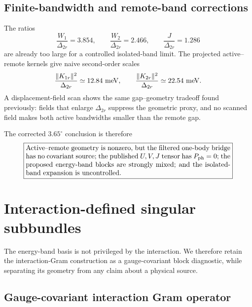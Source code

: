 \documentclass[11pt]{article}
\theoremstyle{remark}
\begin{document}
\subsection{Finite-bandwidth and remote-band corrections}

The ratios
\begin{equation}
 \frac{W_1}{\Delta_{2r}}=3.854,
 \qquad
 \frac{W_2}{\Delta_{2r}}=2.466,
 \qquad
 \frac{J}{\Delta_{2r}}=1.286
\end{equation}
are already too large for a controlled isolated-band limit.  The projected active--remote kernels give naive second-order scales
\begin{equation}
 \frac{\|K_{1r}\|^2}{\Delta_{2r}}\simeq12.84~{\rm meV},
 \qquad
 \frac{\|K_{2r}\|^2}{\Delta_{2r}}\simeq22.54~{\rm meV}.
\end{equation}
A displacement-field scan shows the same gap--geometry tradeoff found previously: fields that enlarge $\Delta_{2r}$ suppress the geometric proxy, and no scanned field makes both active bandwidths smaller than the remote gap.

The corrected $3.65^\circ$ conclusion is therefore
\begin{equation}
\boxed{
\begin{minipage}{0.86\linewidth}
Active--remote geometry is nonzero, but the filtered one-body bridge has no covariant source; the published $U,V,J$ tensor has $P_{\rm ph}=0$; the proposed energy-band blocks are strongly mixed; and the isolated-band expansion is uncontrolled.
\end{minipage}}
\end{equation}

\section{Interaction-defined singular subbundles}
\label{sec:interaction-subblocks}

The energy-band basis is not privileged by the interaction.  We therefore retain the interaction-Gram construction as a gauge-covariant block diagnostic, while separating its geometry from any claim about a physical source.

\subsection{Gauge-covariant interaction Gram operator}
\end{document}
